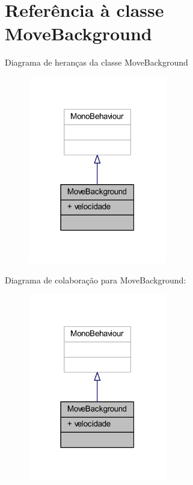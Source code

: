 \section{Referência à classe Move\+Background}
\label{class_move_background}


Diagrama de heranças da classe Move\+Background
\nopagebreak
\begin{figure}[H]
\begin{center}
\leavevmode
\includegraphics[width=171pt]{class_move_background__inherit__graph}
\end{center}
\end{figure}


Diagrama de colaboração para Move\+Background\+:
\nopagebreak
\begin{figure}[H]
\begin{center}
\leavevmode
\includegraphics[width=171pt]{class_move_background__coll__graph}
\end{center}
\end{figure}
